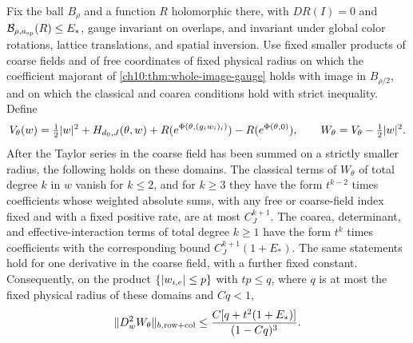 \begin{lemma}\label{ch11:lem:joint-degree-calculation}
Fix the ball $B_\rho$ and a function $R$ holomorphic there, with $DR(I)=0$ and $\mathcal B_{\rho,a_{\mathrm{sp}}}(R)\le E_*$, gauge invariant on overlaps, and invariant under global color rotations, lattice translations, and spatial inversion. Use fixed smaller products of coarse fields and of free coordinates of fixed physical radius on which the coefficient majorant of \cref{ch10:thm:whole-image-gauge} holds with image in $B_{\rho/2}$, and on which the classical and coarea conditions hold with strict inequality. Define
\[
 V_\theta(w)=\tfrac12\lvert w\rvert^2+H_{d_0,J}(\theta,w)+R(e^{\Phi(\theta,(g_iw_i)_i)})-R(e^{\Phi(\theta,0)}),\qquad
 W_\theta=V_\theta-\tfrac12\lvert w\rvert^2.
\]
After the Taylor series in the coarse field has been summed on a strictly smaller radius, the following holds on these domains. The classical terms of $W_\theta$ of total degree $k$ in $w$ vanish for $k\le2$, and for $k\ge3$ they have the form $t^{k-2}$ times coefficients whose weighted absolute sums, with any free or coarse-field index fixed and with a fixed positive rate, are at most $C_J^{k+1}$. The coarea, determinant, and effective-interaction terms of total degree $k\ge1$ have the form $t^k$ times coefficients with the corresponding bound $C_J^{k+1}(1+E_*)$. The same statements hold for one derivative in the coarse field, with a further fixed constant. Consequently, on the product $\{\lvert w_{i,e}\rvert\le p\}$ with $tp\le q$, where $q$ is at most the fixed physical radius of these domains and $Cq<1$,
\begin{equation}\label{ch11:eq:joint-Hessian}
 \lVert D_w^2W_\theta\rVert_{b,\mathrm{row+col}}\le\frac{C[q+t^2(1+E_*)]}{(1-Cq)^3}.
\end{equation}
\end{lemma}

